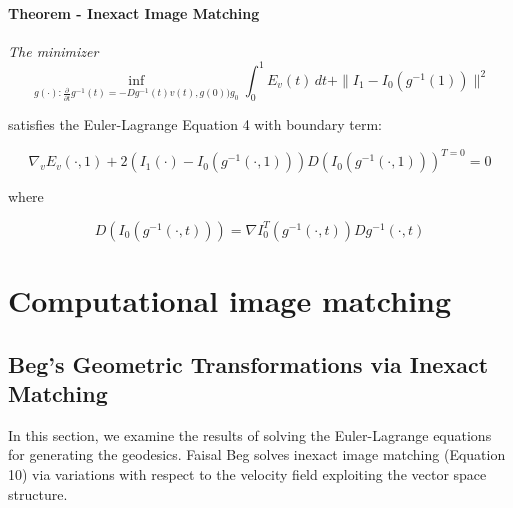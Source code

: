 \documentclass[preprint,review,8pt,times]{elsarticle}
\begin{document}
\paragraph{Theorem - Inexact Image Matching}{\it The minimizer
$$
\underset{g(\cdot): \frac{\partial}{\partial t} g^{-1}(t) = - Dg^{-1}(t)v(t), g(0) ) g_{0}}{\inf} \int_{0}^{1} E_{v}(t) \, dt + \| I_{1} - I_{0}(g^{-1}(1))\|^{2}
$$

satisfies the Euler-Lagrange Equation 4 with boundary term:

$$
\nabla_{v}E_{v}(\cdot, 1) + 2(I_{1}(\cdot) - I_{0}(g^{-1}(\cdot, 1)))D(I_{0}(g^{-1}(\cdot, 1)))^{T = 0} = 0
$$

where

$$
D(I_{0}(g^{-1}(\cdot,t))) = \nabla I_{0}^{T}(g^{-1}(\cdot, t))Dg^{-1}(\cdot, t)
$$
}




\section{Computational image matching}

\subsection{Beg's Geometric Transformations via Inexact Matching}


In this section, we examine the results of solving the Euler-Lagrange equations for generating the geodesics. Faisal Beg solves inexact image matching (Equation 10) via variations with respect to the velocity field exploiting the vector space structure.
\end{document}

